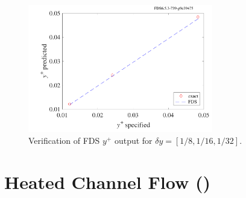 \documentclass[11pt]{book}
\begin{document}
\begin{figure}[ht]
\centering
\includegraphics[height=2.2in]{SCRIPT_FIGURES/yplus}
\caption[Near-wall grid resolution]{Verification of FDS $y^+$ output for $\delta y=[1/8, 1/16, 1/32]$.}
\label{fig_yplus}
\end{figure}


\section{Heated Channel Flow (\texorpdfstring{}{heated\_channel})}
\end{document}
